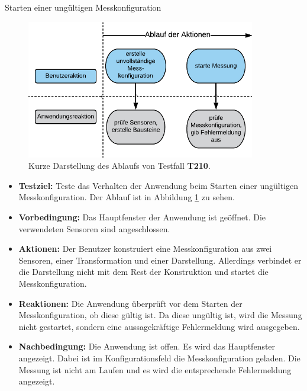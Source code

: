 \documentclass[parskip=full]{scrartcl}
\begin{document}
\begin{description}
\begin{itemize}
\end{itemize}

\hypertarget{link-t210}{\item[T210]} Starten einer ungültigen Messkonfiguration

\begin{figure}[htbp]
	\begin{center}
		\includegraphics[width = 10cm]{Grafik/T210-Ablauf.png}
		\caption{Kurze Darstellung des Ablaufs von Testfall \textbf{T210}.}
		\label{T210-Ablauf}
	\end{center}
\end{figure}
\begin{itemize}

\item []\textbf{Testziel:} Teste das Verhalten der Anwendung beim Starten einer ungültigen Messkonfiguration. Der Ablauf ist in Abbildung \ref{T210-Ablauf} zu sehen.

\item []\textbf{Vorbedingung:} Das Hauptfenster der Anwendung ist geöffnet. Die verwendeten Sensoren sind angeschlossen. 

\item []\textbf{Aktionen:} Der Benutzer konstruiert eine Messkonfiguration aus zwei Sensoren, einer Transformation und einer Darstellung. Allerdings verbindet er die Darstellung nicht mit dem Rest der Konstruktion und startet die Messkonfiguration.
\item []\textbf{Reaktionen:} Die Anwendung überprüft vor dem Starten der Messkonfiguration, ob diese gültig ist. Da diese ungültig ist, wird  die Messung nicht gestartet, sondern eine aussagekräftige Fehlermeldung wird ausgegeben.
\item []\textbf{Nachbedingung:} Die Anwendung ist offen. Es wird das Hauptfenster angezeigt. Dabei ist im Konfigurationsfeld die Messkonfiguration geladen. Die Messung ist nicht am Laufen und es wird die entsprechende Fehlermeldung angezeigt. 


\end{itemize}
\end{description}
\end{document}
